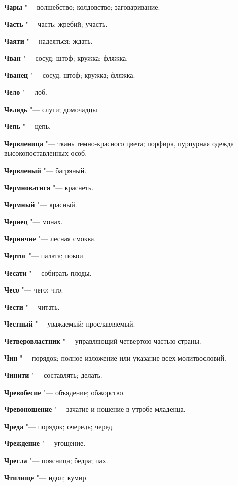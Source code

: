 \begin{mymulticols}
\noindent\textbf{Чары} "--- волшебство; колдовство; заговаривание. 

\noindent\textbf{Часть} "--- часть; жребий; участь. 

\noindent\textbf{Чаяти} "--- надеяться; ждать. 

\noindent\textbf{Чван} "--- сосуд; штоф; кружка; фляжка. 

\noindent\textbf{Чванец} "--- сосуд; штоф; кружка; фляжка. 

\noindent\textbf{Чело} "--- лоб. 

\noindent\textbf{Челядь} "--- слуги; домочадцы. 

\noindent\textbf{Чепь} "--- цепь. 

\noindent\textbf{Червленица} "--- ткань темно-красного цвета; порфира, пурпурная одежда высокопоставленных особ. 

\noindent\textbf{Червленый} "--- багряный. 

\noindent\textbf{Чермноватися} "--- краснеть. 

\noindent\textbf{Чермный} "--- красный. 

\noindent\textbf{Чернец} "--- монах. 

\noindent\textbf{Черничие} "--- лесная смоква. 

\noindent\textbf{Чертог} "--- палата; покои. 

\noindent\textbf{Чесати} "--- собирать плоды. 

\noindent\textbf{Чесо} "--- чего; что. 

\noindent\textbf{Чести} "--- читать. 

\noindent\textbf{Честный} "--- уважаемый; прославляемый. 

\noindent\textbf{Четверовластник} "--- управляющий четвертою частью страны. 

\noindent\textbf{Чин} "--- порядок; полное изложение или указание всех молитвословий. 

\noindent\textbf{Чинити} "--- составлять; делать. 

\noindent\textbf{Чревобесие} "--- объядение; обжорство. 

\noindent\textbf{Чревоношение} "--- зачатие и ношение в утробе младенца. 

\noindent\textbf{Чреда} "--- порядок; очередь; черед. 

\noindent\textbf{Чреждение} "--- угощение. 

\noindent\textbf{Чресла} "--- поясница; бедра; пах. 

\noindent\textbf{Чтилище} "--- идол; кумир. 


\end{mymulticols}
